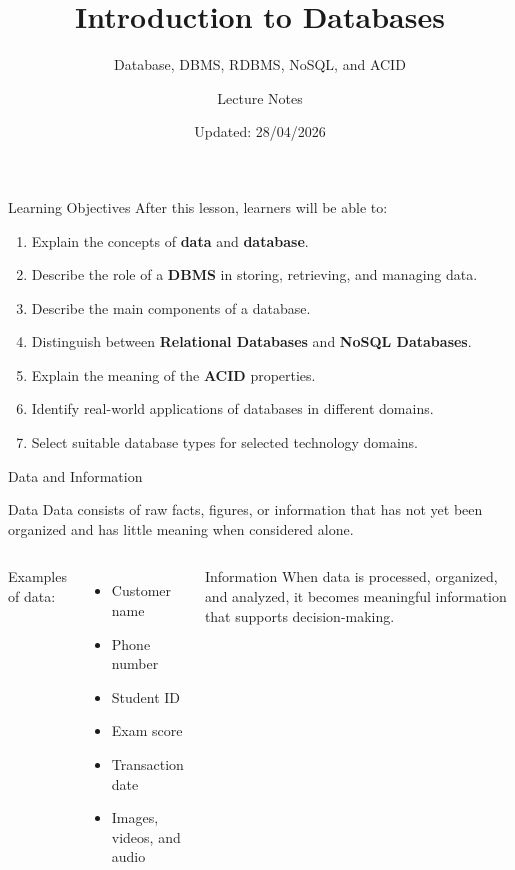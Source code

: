 \documentclass[aspectratio=169,11pt]{beamer}
\title[Introduction to Databases]{Introduction to Databases}
\subtitle{Database, DBMS, RDBMS, NoSQL, and ACID}
\author{Lecture Notes}
\institute{Course: Databases}
\date{Updated: 28/04/2026}
\newcommand{\keyword}[1]{\textcolor{accent}{\textbf{#1}}}
\newcommand{\tightlist}{\setlength{\itemsep}{2pt}\setlength{\parskip}{0pt}}
\begin{document}
\begin{frame}
  \titlepage
\end{frame}

\begin{frame}{Learning Objectives}
\small
After this lesson, learners will be able to:
\begin{enumerate}
\tightlist
  \item Explain the concepts of \keyword{data} and \keyword{database}.
  \item Describe the role of a \keyword{DBMS} in storing, retrieving, and managing data.
  \item Describe the main components of a database.
  \item Distinguish between \keyword{Relational Databases} and \keyword{NoSQL Databases}.
  \item Explain the meaning of the \keyword{ACID} properties.
  \item Identify real-world applications of databases in different domains.
  \item Select suitable database types for selected technology domains.
\end{enumerate}
\end{frame}

\begin{frame}{Data and Information}
\small
\begin{block}{Data}
Data consists of raw facts, figures, or information that has not yet been organized and has little meaning when considered alone.
\end{block}

\begin{columns}[T]
Examples of data:
\begin{itemize}
\tightlist
  \item Customer name
  \item Phone number
  \item Student ID
  \item Exam score
  \item Transaction date
  \item Images, videos, and audio
\end{itemize}

\begin{block}{Information}
When data is processed, organized, and analyzed, it becomes meaningful information that supports decision-making.
\end{block}
\end{columns}
\end{frame}
\end{document}
